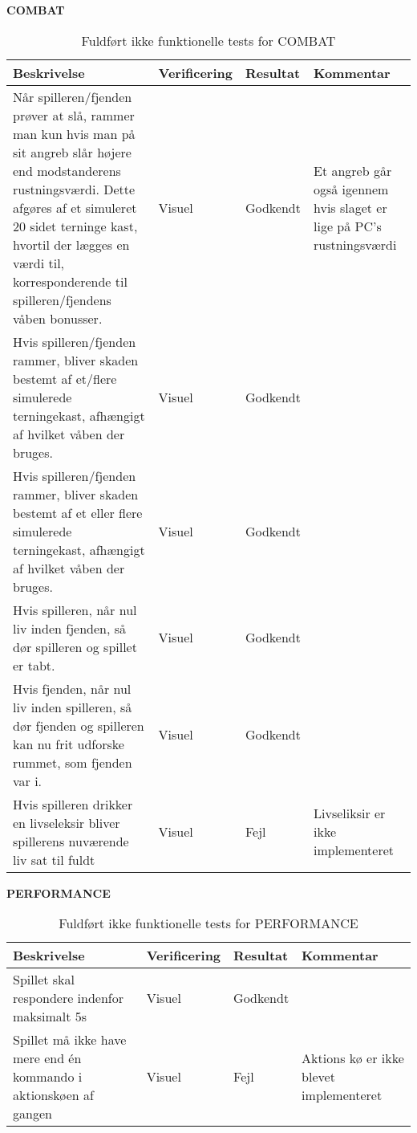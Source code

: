 \textbf{COMBAT}\\
\begin{table}[H]
\caption{ Fuldført ikke funktionelle tests for COMBAT}
\label{tab:}
\begin{tabular}{|p{3cm}|p{3cm}|p{3cm}|p{3cm}|}
\hline
Beskrivelse & Verificering & Resultat & Kommentar \\
\hline
Når spilleren/fjenden prøver at slå, rammer man kun hvis man på sit angreb slår højere end modstanderens rustningsværdi. Dette afgøres af et simuleret 20 sidet terninge kast, hvortil der lægges en værdi til, korresponderende til spilleren/fjendens våben bonusser. & Visuel & Godkendt & Et angreb går også igennem hvis slaget er lige på PC's rustningsværdi \\
\hline
Hvis spilleren/fjenden rammer, bliver skaden bestemt af et/flere simulerede terningekast, afhængigt af hvilket våben der bruges. & Visuel & Godkendt &\\
\hline
Hvis spilleren/fjenden rammer, bliver skaden bestemt af et eller flere simulerede terningekast, afhængigt af hvilket våben der bruges.  & Visuel & Godkendt & \\
\hline
Hvis spilleren, når nul liv inden fjenden, så dør spilleren og spillet er tabt. & Visuel & Godkendt & \\
\hline
Hvis fjenden, når nul liv inden spilleren, så dør fjenden og spilleren kan nu frit udforske rummet, som fjenden var i. & Visuel & Godkendt & \\
\hline
Hvis spilleren drikker en livseleksir bliver spillerens nuværende liv sat til fuldt & Visuel & Fejl & Livseliksir er ikke implementeret \\
\hline
\end{tabular}
\end{table}

\textbf{PERFORMANCE}
\begin{table}[H]
\caption{ Fuldført ikke funktionelle tests for PERFORMANCE}
\label{tab:}
\begin{tabular}{|p{3cm}|p{3cm}|p{3cm}|p{3cm}|}
\hline
Beskrivelse & Verificering & Resultat & Kommentar \\
\hline
 Spillet skal respondere indenfor maksimalt 5s & Visuel & Godkendt & \\
\hline
 Spillet må ikke have mere end én kommando i aktionskøen af gangen & Visuel & Fejl & Aktions kø er ikke blevet implementeret\\
\hline
\end{tabular}
\end{table}

